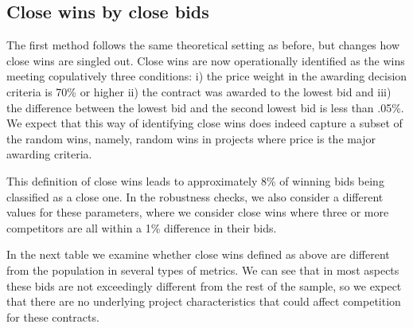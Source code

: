 \subsection{Close wins by close bids}
 The first method follows the same theoretical setting as before, but changes how close wins are singled out. Close wins are now operationally identified as the wins meeting copulatively  three conditions: i) the price weight in the awarding decision criteria is 70\% or higher ii) the contract was awarded to the lowest bid and iii) the difference between the lowest bid and the second lowest bid is less than .05\%. We expect that this way of identifying close wins does indeed capture a subset of the random wins, namely, random wins in projects where price is the major awarding criteria.

This definition of close wins leads to approximately 8\% of winning bids being classified as a close one. In the robustness checks, we also consider a different values for these parameters, where we consider close wins where three or more competitors are all within a 1\% difference in their bids.

In the next table we examine whether close wins defined as  above are different from the population in several types of metrics. We can see that in most aspects these bids are not exceedingly different from the rest of the sample, so we expect that there are no underlying project characteristics that could affect competition for these contracts.

\begin{table}[!h]
\caption{Comparison of key statistics between close wins(<0.05\% difference between 1st and runner-up) and regular wins}
\centering
{}
\end{table}

